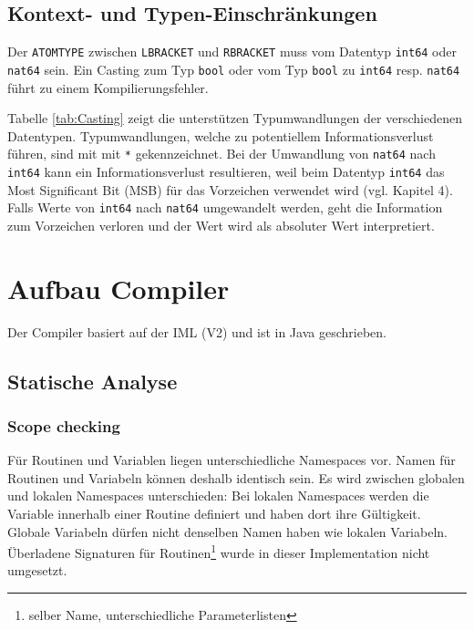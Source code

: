 \documentclass[10pt, a4paper, twocolumn]{article} %
\begin{document}
\subsection{Kontext- und Typen-Einschränkungen}
Der \texttt{ATOMTYPE} zwischen \texttt{LBRACKET} und \texttt{RBRACKET} muss vom Datentyp \texttt{int64} oder \texttt{nat64} sein.
Ein Casting zum Typ \texttt{bool} oder vom Typ \texttt{bool} zu \texttt{int64} resp. \texttt{nat64} führt zu einem Kompilierungsfehler.

Tabelle \ref{tab:Casting} zeigt die unterstützen Typumwandlungen der verschiedenen Datentypen.
Typumwandlungen, welche zu potentiellem Informationsverlust führen, sind mit mit \texttt{*} gekennzeichnet.
Bei der Umwandlung von \texttt{nat64} nach \texttt{int64} kann ein Informationsverlust resultieren, weil beim Datentyp \texttt{int64} das Most Significant Bit (MSB) für das Vorzeichen verwendet wird (vgl. Kapitel 4). %
Falls Werte von \texttt{int64} nach \texttt{nat64} umgewandelt werden, geht die Information zum Vorzeichen verloren und der Wert wird als absoluter Wert interpretiert.
\begin{table}[h]
    \tiny
    \centering
    \caption{Casting zwischen Datentypen}
    \label{tab:Casting}
\end{table}

\section{Aufbau Compiler}
Der Compiler basiert auf der IML (V2) und ist in Java geschrieben.

\subsection{Statische Analyse}

\subsubsection*{Scope checking}
Für Routinen und Variablen liegen unterschiedliche Namespaces vor.
Namen für Routinen und Variabeln können deshalb identisch sein.
Es wird zwischen globalen und lokalen Namespaces unterschieden: Bei lokalen Namespaces werden die Variable innerhalb einer Routine definiert und haben dort ihre Gültigkeit.
Globale Variabeln dürfen nicht denselben Namen haben wie lokalen Variabeln.
Überladene Signaturen für Routinen\footnote{selber Name, unterschiedliche Parameterlisten} wurde in dieser Implementation nicht umgesetzt.
\end{document}
